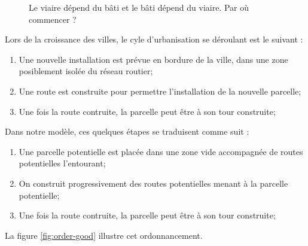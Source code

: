 \documentclass[12pt]{article}
\begin{document}
\begin{figure}[H]
  \centering
  
  \caption{Le viaire dépend du bâti et le bâti dépend du viaire. Par
    où commencer ?}
  \label{fig:bati-viaire}
\end{figure}

Lors de la croissance des villes, le cyle d'urbanisation se déroulant
est le suivant :

\begin{enumerate}
\item{Une nouvelle installation est prévue en bordure de la ville,
  dans une zone posiblement isolée du réseau routier;}
\item{Une route est construite pour permettre l'installation de la
  nouvelle parcelle;}
\item{Une fois la route contruite, la parcelle peut être à son tour construite;}
\end{enumerate}

Dans notre modèle, ces quelques étapes se traduisent comme suit :

\begin{enumerate}
\item{Une parcelle potentielle est placée dans une zone vide
  accompagnée de routes potentielles l'entourant;}
\item{On construit progressivement des routes potentielles menant à la
  parcelle potentielle;}
\item{Une fois la route contruite, la parcelle peut être à son tour
  construite;}
\end{enumerate}

La figure \ref{fig:order-good} illustre cet ordonnancement.
\end{document}
